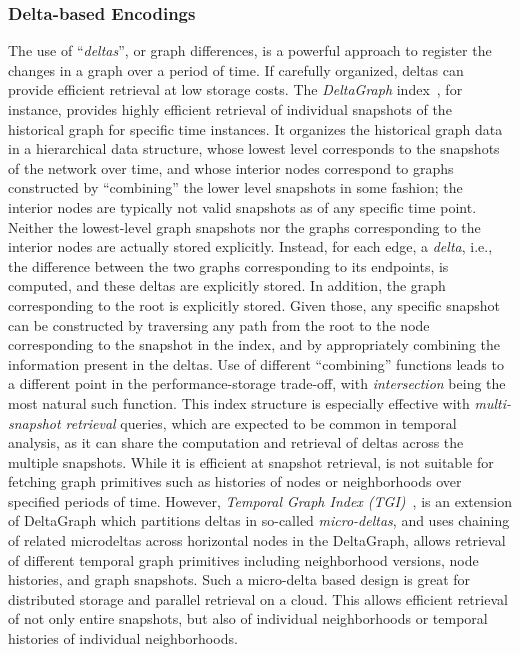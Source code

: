 \documentclass[graybox, natbib, nosecnum, twocolumn]{svmult}
\begin{document}
\subsubsection{Delta-based Encodings}
The use of ``{\em deltas}'', or graph differences, is a powerful approach to register the changes in a graph over a period of time. If carefully organized, deltas can provide efficient retrieval at low storage costs. 
The {\em DeltaGraph} index~\citep{khurana2013efficient}, for instance, provides highly efficient retrieval of individual snapshots of the historical graph for specific time instances. It organizes the historical graph data in a hierarchical data structure, whose lowest level corresponds
to the snapshots of the network over time, and whose interior nodes correspond to graphs constructed by ``combining''
the lower level snapshots in some fashion; the interior nodes are typically not valid snapshots as of any specific time point. Neither the lowest-level
graph snapshots nor the graphs corresponding to the interior nodes are actually stored explicitly. Instead, for each edge, a {\em delta}, i.e., the
difference between the two graphs corresponding to its endpoints, is computed, and these deltas are explicitly stored. In addition, the graph
corresponding to the root is explicitly stored. Given those, any specific snapshot can be constructed by traversing any
path from the root to the node corresponding to the snapshot in the index, and by appropriately combining the information present in the deltas.
Use of different ``combining'' functions leads to a different point in the performance-storage trade-off, with {\em intersection} being the most
natural such function.  This index structure is especially effective with {\em multi-snapshot retrieval} queries, which are expected to be common in temporal 
analysis, as it can share the computation and retrieval of deltas across the multiple snapshots. 
While it is efficient at snapshot retrieval, is not suitable for fetching graph primitives such as histories of nodes or neighborhoods over specified periods of time. However, {\em Temporal Graph Index (TGI)}~\citep{khurana2016storing}, is an extension of DeltaGraph which partitions deltas in so-called {\em micro-deltas}, and uses chaining of related microdeltas across horizontal nodes in the DeltaGraph, allows retrieval of different temporal graph primitives including neighborhood versions, node histories, and graph snapshots. 
Such a micro-delta based design is great for distributed storage and parallel retrieval on a cloud. This allows efficient retrieval of not only
entire snapshots, but also of individual neighborhoods or temporal histories of individual neighborhoods.
\end{document}
